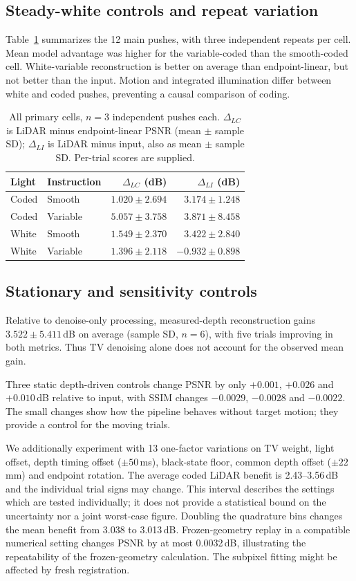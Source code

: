 \subsection{Steady-white controls and repeat variation}
Table~\ref{tab:groups} summarizes the 12 main pushes, with three independent repeats per cell. Mean model advantage was higher for the variable-coded than the smooth-coded cell. White-variable reconstruction is better on average than endpoint-linear, but not better than the input. Motion and integrated illumination differ between white and coded pushes, preventing a causal comparison of coding.

\begin{table}[t]
\caption{All primary cells, $n=3$ independent pushes each. $\Delta_{LC}$ is LiDAR minus endpoint-linear PSNR (mean $\pm$ sample SD); $\Delta_{LI}$ is LiDAR minus input, also as mean $\pm$ sample SD. Per-trial scores are supplied.}
\label{tab:groups}\centering\footnotesize
\begin{tabular}{llrr}\hline
Light & Instruction & $\Delta_{LC}$ (dB) & $\Delta_{LI}$ (dB)\\\hline
Coded & Smooth & $1.020\pm2.694$ & $3.174\pm1.248$\\
Coded & Variable & $5.057\pm3.758$ & $3.871\pm8.458$\\
White & Smooth & $1.549\pm2.370$ & $3.422\pm2.840$\\
White & Variable & $1.396\pm2.118$ & $-0.932\pm0.898$\\\hline
\end{tabular}
\end{table}

\subsection{Stationary and sensitivity controls}
Relative to denoise-only processing, measured-depth reconstruction gains $3.522\pm5.411$\,dB on average (sample SD, $n=6$), with five trials improving in both metrics. Thus TV denoising alone does not account for the observed mean gain.

Three static depth-driven controls change PSNR by only $+0.001$, $+0.026$ and $+0.010$\,dB relative to input, with SSIM changes $-0.0029$, $-0.0028$ and $-0.0022$. The small changes show how the pipeline behaves without target motion; they provide a control for the moving trials.

We additionally experiment with 13 one-factor variations on TV weight, light offset, depth timing offset ($\pm50$\,ms), black-state floor, common depth offset ($\pm22$\,mm) and endpoint rotation. The average coded LiDAR benefit is 2.43--3.56\,dB and the individual trial signs may change. This interval describes the settings which are tested individually; it does not provide a statistical bound on the uncertainty nor a joint worst-case figure. Doubling the quadrature bins changes the mean benefit from 3.038 to 3.013\,dB. Frozen-geometry replay in a compatible numerical setting changes PSNR by at most 0.0032\,dB, illustrating the repeatability of the frozen-geometry calculation. The subpixel fitting might be affected by fresh registration.
